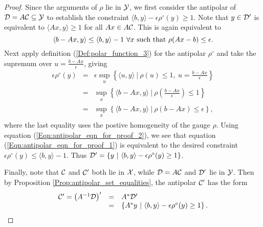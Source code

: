 \begin{proof}
Since the arguments of $\rho$ lie in ${\mathcal Y}$, we first consider the antipolar of ${\mathcal D} = A{\mathcal C} \subseteq {\mathcal Y}$ to establish the constraint $\langle b, y \rangle - \epsilon \rho^\circ(y) \geq 1$.  Note that $y \in {\mathcal D}'$ is equivalent to $\langle Ax, y \rangle \geq 1$ for all $Ax \in A{\mathcal C}$.  This is again equivalent to
\begin{equation}				\label{Eqn:antipolar_eqn_for_proof_1}
\langle b - Ax, y \rangle \leq \langle b, y \rangle - 1 \ \forall x \ \textnormal{such that} \ \rho(Ax-b) \leq \epsilon.
\end{equation}
Next apply definition (\ref{Def:polar_function_3}) for the antipolar $\rho^\circ$ and take the supremum over $u = \frac{b-Ax}{\epsilon}$, giving 
\begin{equation}  		\label{Eqn:antipolar_eqn_for_proof_2}
\begin{array}{lll}
\epsilon \rho^\circ(y) 	&	=	&	\epsilon \sup\limits_{\substack{u}} \left\{ \langle u, y \rangle \ | \ \rho(u) \leq 1, \ u = \frac{b-Ax}{\epsilon}  \right\} 	\\
	&	= 	&  \sup\limits_{\substack{x}} \left\{ \langle b - Ax, y \rangle \ | \ \rho\left(\frac{b-Ax}{\epsilon}\right) \leq 1  \right\} \\
		&	= 	&  \sup\limits_{\substack{x}} \left\{ \langle b - Ax, y \rangle \ | \ \rho(b-Ax) \leq \epsilon  \right\},
\end{array}
\end{equation}
where the last equality uses the postive homogeneity of the gauge $\rho$.  Using equation (\ref{Eqn:antipolar_eqn_for_proof_2}), we see that equation (\ref{Eqn:antipolar_eqn_for_proof_1}) is equivalent to the desired constraint $\epsilon \rho^\circ(y) \leq  \langle b, y \rangle - 1$.  Thus ${\mathcal D}' = \{ y \ | \ \langle b, y \rangle - \epsilon \rho^\circ(y) \geq 1 \}$.

Finally, note that ${\mathcal C}$ and ${\mathcal C}'$ both lie in ${\mathcal X}$, while ${\mathcal D} = A{\mathcal C}$ and ${\mathcal D}'$ lie in ${\mathcal Y}$.  Then by Proposition \ref{Prop:antipolar_set_equalities}, the antipolar ${\mathcal C}'$ has the form
\begin{equation}
\begin{array}{lll}
\caC' = \left(A^{-1} \caD \right)'	& =  &	A^* \caD' 	\\
	&	=	&		\left\{ A^*y 	\	|	\ \langle b, y \rangle - \epsilon \rho^\circ(y) \geq 1  \right\}.
\end{array}
\end{equation}
\end{proof}





